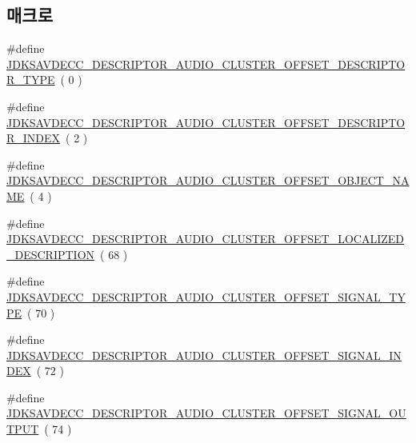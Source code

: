 \subsection*{매크로}
\begin{DoxyCompactItemize}
\item 
\#define \hyperlink{group__descriptor__audio__cluster_ga99905e98b37f207d81b7b3dd459a6c1f}{J\+D\+K\+S\+A\+V\+D\+E\+C\+C\+\_\+\+D\+E\+S\+C\+R\+I\+P\+T\+O\+R\+\_\+\+A\+U\+D\+I\+O\+\_\+\+C\+L\+U\+S\+T\+E\+R\+\_\+\+O\+F\+F\+S\+E\+T\+\_\+\+D\+E\+S\+C\+R\+I\+P\+T\+O\+R\+\_\+\+T\+Y\+PE}~( 0 )
\item 
\#define \hyperlink{group__descriptor__audio__cluster_gab1c50b0315346792cfdf904c9fe5e9c0}{J\+D\+K\+S\+A\+V\+D\+E\+C\+C\+\_\+\+D\+E\+S\+C\+R\+I\+P\+T\+O\+R\+\_\+\+A\+U\+D\+I\+O\+\_\+\+C\+L\+U\+S\+T\+E\+R\+\_\+\+O\+F\+F\+S\+E\+T\+\_\+\+D\+E\+S\+C\+R\+I\+P\+T\+O\+R\+\_\+\+I\+N\+D\+EX}~( 2 )
\item 
\#define \hyperlink{group__descriptor__audio__cluster_gabf8a22db3824591d816fc2dc5018dc77}{J\+D\+K\+S\+A\+V\+D\+E\+C\+C\+\_\+\+D\+E\+S\+C\+R\+I\+P\+T\+O\+R\+\_\+\+A\+U\+D\+I\+O\+\_\+\+C\+L\+U\+S\+T\+E\+R\+\_\+\+O\+F\+F\+S\+E\+T\+\_\+\+O\+B\+J\+E\+C\+T\+\_\+\+N\+A\+ME}~( 4 )
\item 
\#define \hyperlink{group__descriptor__audio__cluster_ga18c7044a8a2b256122292e37f27c81b8}{J\+D\+K\+S\+A\+V\+D\+E\+C\+C\+\_\+\+D\+E\+S\+C\+R\+I\+P\+T\+O\+R\+\_\+\+A\+U\+D\+I\+O\+\_\+\+C\+L\+U\+S\+T\+E\+R\+\_\+\+O\+F\+F\+S\+E\+T\+\_\+\+L\+O\+C\+A\+L\+I\+Z\+E\+D\+\_\+\+D\+E\+S\+C\+R\+I\+P\+T\+I\+ON}~( 68 )
\item 
\#define \hyperlink{group__descriptor__audio__cluster_ga54a3c608cc0abb1d34cdaa6a8f184380}{J\+D\+K\+S\+A\+V\+D\+E\+C\+C\+\_\+\+D\+E\+S\+C\+R\+I\+P\+T\+O\+R\+\_\+\+A\+U\+D\+I\+O\+\_\+\+C\+L\+U\+S\+T\+E\+R\+\_\+\+O\+F\+F\+S\+E\+T\+\_\+\+S\+I\+G\+N\+A\+L\+\_\+\+T\+Y\+PE}~( 70 )
\item 
\#define \hyperlink{group__descriptor__audio__cluster_ga0705a9afca27359e3246a6633259fde6}{J\+D\+K\+S\+A\+V\+D\+E\+C\+C\+\_\+\+D\+E\+S\+C\+R\+I\+P\+T\+O\+R\+\_\+\+A\+U\+D\+I\+O\+\_\+\+C\+L\+U\+S\+T\+E\+R\+\_\+\+O\+F\+F\+S\+E\+T\+\_\+\+S\+I\+G\+N\+A\+L\+\_\+\+I\+N\+D\+EX}~( 72 )
\item 
\#define \hyperlink{group__descriptor__audio__cluster_ga74a49e9ddd00f7b9d4f088ab8aeb77e2}{J\+D\+K\+S\+A\+V\+D\+E\+C\+C\+\_\+\+D\+E\+S\+C\+R\+I\+P\+T\+O\+R\+\_\+\+A\+U\+D\+I\+O\+\_\+\+C\+L\+U\+S\+T\+E\+R\+\_\+\+O\+F\+F\+S\+E\+T\+\_\+\+S\+I\+G\+N\+A\+L\+\_\+\+O\+U\+T\+P\+UT}~( 74 )
\item 

\end{DoxyCompactItemize}
